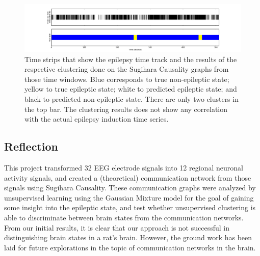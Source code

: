 \documentclass[journal,12pt,onecolumn,draftclsnofoot]{IEEEtran}  %
\begin{document}
\begin{figure}[H]
	\centering
	\includegraphics[width=\linewidth]{figures/strip_visual.pdf}
	\caption{Time strips that show the epilepsy time track and the results of the respective clustering done on the Sugihara Causality graphs from those time windows. Blue corresponds to true non-epileptic state; yellow to true epileptic state; white to predicted epileptic state; and black to predicted non-epileptic state. There are only two clusters in the top bar. The clustering results does not show any correlation with the actual epilepsy induction time series.}
	\label{fig:strip_visual}
\end{figure}



\subsection{Reflection}
This project transformed 32 EEG electrode signals into 12 regional neuronal activity signals, and created a (theoretical) communication network from those signals using Sugihara Causality. These communication graphs were analyzed by unsupervised learning using the Gaussian Mixture model for the goal of gaining some insight into the epileptic state, and test whether unsupervised clustering is able to discriminate between brain states from the communication networks. From our initial results, it is clear that our approach is not successful in distinguishing brain states in a rat's brain. However, the ground work has been laid for future explorations in the topic of communication networks in the brain. 

\end{document}
